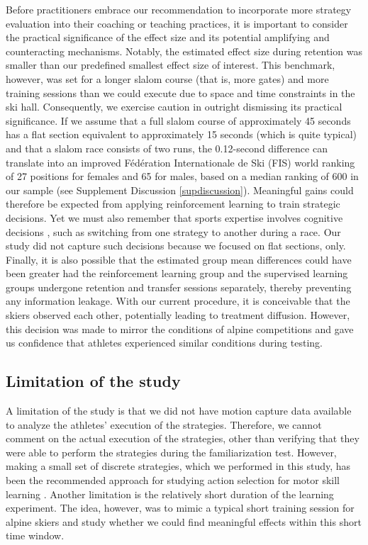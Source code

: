 \documentclass[pdflatex,sn-nature]{sn-jnl}%
\theoremstyle{thmstyleone}%
\theoremstyle{thmstyletwo}%
\theoremstyle{thmstylethree}%
\begin{document}
Before practitioners embrace our recommendation to incorporate more strategy evaluation into their coaching or teaching practices, it is important to consider the practical significance of the effect size and its potential amplifying and counteracting mechanisms\cite{anvari_not_2023}. Notably, the estimated effect size during retention was smaller than our predefined smallest effect size of interest. This benchmark, however, was set for a longer slalom course (that is, more gates) and more training sessions than we could execute due to space and time constraints in the ski hall. Consequently, we exercise caution in outright dismissing its practical significance. If we assume that a full slalom course of approximately 45 seconds has a flat section equivalent to approximately 15 seconds (which is quite typical) and that a slalom race consists of two runs, the 0.12-second difference can translate into an improved Fédération Internationale de Ski (FIS) world ranking of 27 positions for females and 65 for males, based on a median ranking of 600 in our sample (see Supplement Discussion \ref{supdiscussion}). Meaningful gains could therefore be expected from applying reinforcement learning to train strategic decisions. Yet we must also remember that sports expertise involves cognitive decisions  \cite{mangalam_investigating_2023, krakauer_motor_2019, stanley_motor_2013}, such as switching from one strategy to another during a race. Our study did not capture such decisions because we focused on flat sections, only. Finally, it is also possible that the estimated group mean differences could have been greater had the reinforcement learning group and the supervised learning groups undergone retention and transfer sessions separately, thereby preventing any information leakage. With our current procedure, it is conceivable that the skiers observed each other, potentially leading to treatment diffusion. However, this decision was made to mirror the conditions of alpine competitions and gave us confidence that athletes experienced similar conditions during testing.


\subsection{Limitation of the study}
A limitation of the study is that we did not have motion capture data available to analyze the athletes' execution of the strategies. Therefore, we cannot comment on the actual execution of the strategies, other than verifying that they were able to perform the strategies during the familiarization test. However, making a small set of discrete strategies, which we performed in this study, has been the recommended approach for studying action selection for motor skill learning \cite{taylor_role_2012, taylor_flexible_2011}. Another limitation is the relatively short duration of the learning experiment. The idea, however, was to mimic a typical short training session for alpine skiers and study whether we could find meaningful effects within this short time window.
\end{document}
